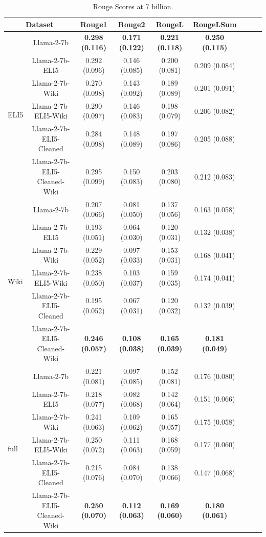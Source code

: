 \documentclass[11pt, oneside]{article}   	%
\begin{document}
\begin{table}[ht]
\hspace{-.5in}
\begin{tabular}{lcccccccc}
\toprule
\multicolumn{2}{c}{Dataset} & \multicolumn{1}{c}{Rouge1} & \multicolumn{1}{c}{Rouge2} & \multicolumn{1}{c}{RougeL} & \multicolumn{1}{c}{RougeLSum} \\
\midrule
\multirow{6}{*}{ELI5} & Llama-2-7b & \textbf{0.298 (0.116)} & \textbf{0.171 (0.122)} & \textbf{0.221 (0.118)} & \textbf{0.250 (0.115)} \\
& Llama-2-7b-ELI5 & 0.292 (0.096) & 0.146 (0.085) & 0.200 (0.081) & 0.209 (0.084) \\
& Llama-2-7b-Wiki & 0.270 (0.098) & 0.143 (0.092) & 0.189 (0.089) & 0.201 (0.091) \\
& Llama-2-7b-ELI5-Wiki & 0.290 (0.097) & 0.146 (0.083) & 0.198 (0.079) & 0.206 (0.082) \\
& Llama-2-7b-ELI5-Cleaned & 0.284 (0.098) & 0.148 (0.089) & 0.197 (0.086) & 0.205 (0.088) \\
& Llama-2-7b-ELI5-Cleaned-Wiki & 0.295 (0.099) & 0.150 (0.083) & 0.203 (0.080) & 0.212 (0.083) \\
\midrule
\multirow{6}{*}{Wiki} & Llama-2-7b & 0.207 (0.066) & 0.081 (0.050) & 0.137 (0.056) & 0.163 (0.058) \\
& Llama-2-7b-ELI5 & 0.193 (0.051) & 0.064 (0.030) & 0.120 (0.031) & 0.132 (0.038) \\
& Llama-2-7b-Wiki & 0.229 (0.052) & 0.097 (0.033) & 0.153 (0.031) & 0.168 (0.041) \\
& Llama-2-7b-ELI5-Wiki & 0.238 (0.050) & 0.103 (0.037) & 0.159 (0.035) & 0.174 (0.041) \\
& Llama-2-7b-ELI5-Cleaned & 0.195 (0.052) & 0.067 (0.031) & 0.120 (0.032) & 0.132 (0.039) \\
& Llama-2-7b-ELI5-Cleaned-Wiki & \textbf{0.246 (0.057)} & \textbf{0.108 (0.038)} & \textbf{0.165 (0.039)} & \textbf{0.181 (0.049)} \\
\midrule
\multirow{6}{*}{full} & Llama-2-7b & 0.221 (0.081) & 0.097 (0.085) & 0.152 (0.081) & 0.176 (0.080) \\
& Llama-2-7b-ELI5 & 0.218 (0.077) & 0.082 (0.068) & 0.142 (0.064) & 0.151 (0.066) \\
& Llama-2-7b-Wiki & 0.241 (0.063) & 0.109 (0.062) & 0.165 (0.057) & 0.175 (0.058) \\
& Llama-2-7b-ELI5-Wiki & 0.250 (0.072) & 0.111 (0.063) & 0.168 (0.059) & 0.177 (0.060) \\
& Llama-2-7b-ELI5-Cleaned & 0.215 (0.076) & 0.084 (0.070) & 0.138 (0.066) & 0.147 (0.068) \\
& Llama-2-7b-ELI5-Cleaned-Wiki & \textbf{0.250 (0.070)} & \textbf{0.112 (0.063)} & \textbf{0.169 (0.060)} & \textbf{0.180 (0.061)} \\
\bottomrule
\end{tabular}
\caption{Rouge Scores at 7 billion.}
\label{tab:rouge_scores_7B}
\end{table}
\end{document}

